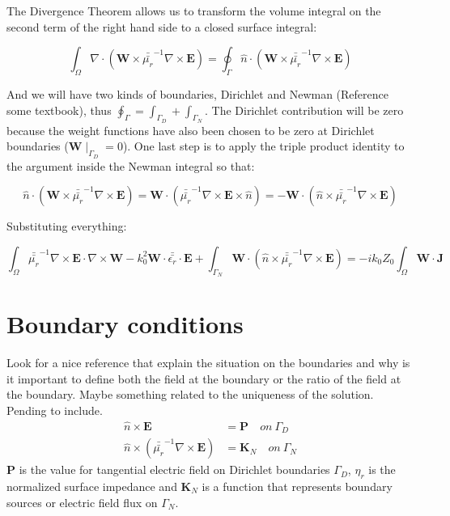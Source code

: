 The Divergence Theorem allows us to transform the volume integral on the second term of the right hand side to a closed surface integral:

\begin{equation}
\int_{\Omega}\nabla\cdot
\left(\mathbf{W}\times\bar{\bar{\mu_r}}^{-1}\nabla\times\mathbf{E}
\right) = \oint_{\Gamma}\hat{n}\cdot
\left(\mathbf{W}\times\bar{\bar{\mu_r}}^{-1}\nabla\times\mathbf{E}
\right) 
\end{equation}

And we will have two kinds of boundaries, Dirichlet and Newman (Reference some textbook), thus $\oint_{\Gamma} = \int_{\Gamma_D}+\int_{\Gamma_N}$. The Dirichlet contribution will be zero because the weight functions  have also been chosen to be zero at Dirichlet boundaries ($\mathbf{W}\mid_{\Gamma_D}=0$). 
One last step is to apply the triple product identity to the argument inside the Newman integral so that:

$$\hat{n}\cdot
\left(\mathbf{W}\times\bar{\bar{\mu_r}}^{-1}
\nabla\times\mathbf{E}\right) =\mathbf{W} \cdot
 \left(\bar{\bar{\mu_r}}^{-1}
\nabla\times\mathbf{E}\times\hat{n}\right) = -\mathbf{W} \cdot
 \left(\hat{n}\times\bar{\bar{\mu_r}}^{-1}
\nabla\times\mathbf{E}\right)$$

Substituting everything:

\begin{equation}
\int_{\Omega} \bar{\bar{\mu_r}}^{-1}\nabla\times \mathbf{E}\cdot \nabla\times\mathbf{W}
-k_0^{2}\mathbf{W}\cdot \bar{\bar{\epsilon_r}}\cdot \mathbf{E}
+ \int_{\Gamma_N} \mathbf{W} \cdot
 \left(\hat{n}\times\bar{\bar{\mu_r}}^{-1}
\nabla\times\mathbf{E}\right)
= -ik_0Z_0 \int_{\Omega} \mathbf{W}\cdot\mathbf{J} \label{eq:E-wave-weak} 
\end{equation}


\section{Boundary conditions}

Look for a nice reference that explain the situation on the boundaries and why is it important to define both the field at the boundary or the ratio of the field at the boundary. Maybe something related to the uniqueness of the solution. Pending to include. 
\begin{align}
\hat{n}\times\mathbf{E}&=\mathbf{P} \quad on \ \Gamma_D\\
\hat{n}\times\left(\bar{\bar{\mu_r}}^{-1}
\nabla\times \mathbf{E}\right) &=\mathbf{K}_N \quad on \ \Gamma_N \label{eq:Robin}
\end{align}
$\mathbf{P}$ is the value for tangential electric field on Dirichlet boundaries $\Gamma_D$, $\eta_r$ is the normalized surface impedance and $\mathbf{K}_N$ is a function that represents boundary sources or electric field flux on $\Gamma_N$. 

